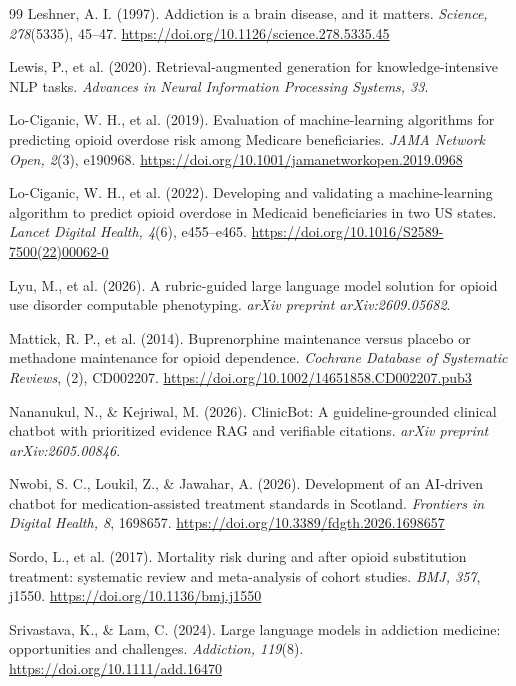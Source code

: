 \documentclass[11pt]{article}
\begin{document}
\begin{thebibliography}{99}
 Leshner, A. I. (1997). Addiction is a brain disease, and it matters. \emph{Science, 278}(5335), 45--47. \url{https://doi.org/10.1126/science.278.5335.45}

 Lewis, P., et al. (2020). Retrieval-augmented generation for knowledge-intensive NLP tasks. \emph{Advances in Neural Information Processing Systems, 33}.

 Lo-Ciganic, W. H., et al. (2019). Evaluation of machine-learning algorithms for predicting opioid overdose risk among Medicare beneficiaries. \emph{JAMA Network Open, 2}(3), e190968. \url{https://doi.org/10.1001/jamanetworkopen.2019.0968}

 Lo-Ciganic, W. H., et al. (2022). Developing and validating a machine-learning algorithm to predict opioid overdose in Medicaid beneficiaries in two US states. \emph{Lancet Digital Health, 4}(6), e455--e465. \url{https://doi.org/10.1016/S2589-7500(22)00062-0}

 Lyu, M., et al. (2026). A rubric-guided large language model solution for opioid use disorder computable phenotyping. \emph{arXiv preprint arXiv:2609.05682}.

 Mattick, R. P., et al. (2014). Buprenorphine maintenance versus placebo or methadone maintenance for opioid dependence. \emph{Cochrane Database of Systematic Reviews}, (2), CD002207. \url{https://doi.org/10.1002/14651858.CD002207.pub3}

 Nananukul, N., \& Kejriwal, M. (2026). ClinicBot: A guideline-grounded clinical chatbot with prioritized evidence RAG and verifiable citations. \emph{arXiv preprint arXiv:2605.00846}.

 Nwobi, S. C., Loukil, Z., \& Jawahar, A. (2026). Development of an AI-driven chatbot for medication-assisted treatment standards in Scotland. \emph{Frontiers in Digital Health, 8}, 1698657. \url{https://doi.org/10.3389/fdgth.2026.1698657}

 Sordo, L., et al. (2017). Mortality risk during and after opioid substitution treatment: systematic review and meta-analysis of cohort studies. \emph{BMJ, 357}, j1550. \url{https://doi.org/10.1136/bmj.j1550}

 Srivastava, K., \& Lam, C. (2024). Large language models in addiction medicine: opportunities and challenges. \emph{Addiction, 119}(8). \url{https://doi.org/10.1111/add.16470}


\end{thebibliography}
\end{document}
